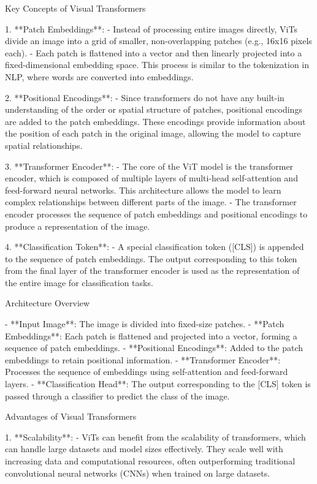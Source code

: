  Key Concepts of Visual Transformers

1. **Patch Embeddings**:
   - Instead of processing entire images directly, ViTs divide an image into a grid of smaller, non-overlapping patches (e.g., 16x16 pixels each).
   - Each patch is flattened into a vector and then linearly projected into a fixed-dimensional embedding space. This process is similar to the tokenization in NLP, where words are converted into embeddings.

2. **Positional Encodings**:
   - Since transformers do not have any built-in understanding of the order or spatial structure of patches, positional encodings are added to the patch embeddings. These encodings provide information about the position of each patch in the original image, allowing the model to capture spatial relationships.

3. **Transformer Encoder**:
   - The core of the ViT model is the transformer encoder, which is composed of multiple layers of multi-head self-attention and feed-forward neural networks. This architecture allows the model to learn complex relationships between different parts of the image.
   - The transformer encoder processes the sequence of patch embeddings and positional encodings to produce a representation of the image.

4. **Classification Token**:
   - A special classification token ([CLS]) is appended to the sequence of patch embeddings. The output corresponding to this token from the final layer of the transformer encoder is used as the representation of the entire image for classification tasks.

 Architecture Overview

- **Input Image**: The image is divided into fixed-size patches.
- **Patch Embeddings**: Each patch is flattened and projected into a vector, forming a sequence of patch embeddings.
- **Positional Encodings**: Added to the patch embeddings to retain positional information.
- **Transformer Encoder**: Processes the sequence of embeddings using self-attention and feed-forward layers.
- **Classification Head**: The output corresponding to the [CLS] token is passed through a classifier to predict the class of the image.

 Advantages of Visual Transformers

1. **Scalability**:
   - ViTs can benefit from the scalability of transformers, which can handle large datasets and model sizes effectively. They scale well with increasing data and computational resources, often outperforming traditional convolutional neural networks (CNNs) when trained on large datasets.

